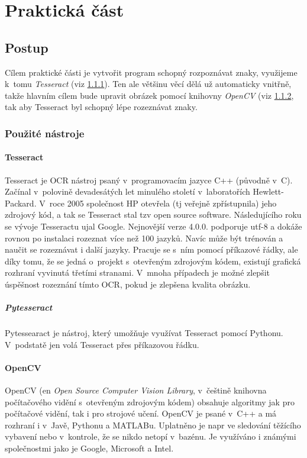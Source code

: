 \documentclass[12pt]{report}			%
\begin{document}
	
	\part{Praktická část}
	\chapter{Postup}
	Cílem praktické části je vytvořit program schopný rozpoznávat znaky, využijeme k~tomu \emph{Tesseract} (\gls{viz} \ref{sec:Tesseract}). Ten ale většinu věcí dělá už automaticky vnitřně, takže hlavním cílem bude upravit obrázek pomocí knihovny \emph{OpenCV} (\gls{viz} \ref{sec:OpenCV}, tak aby Tesseract byl schopný lépe rozeznávat znaky.
	
	\section{Použité nástroje}
	\label{sec:used}
	\subsection{Tesseract}
	\label{sec:Tesseract}
	Tesseract je \gls{OCR} nástroj psaný v~programovacím jazyce C++ (původně v~C).  Začínal v~polovině devadesátých let minulého století v~laboratořích Hewlett-Packard. V~roce 2005 společnost HP otevřela (\gls{tj} veřejně zpřístupnila) jeho zdrojový kód, a tak se Tesseract stal \gls{tzv} open source software. Následujícího roku se vývoje Tesseractu ujal Google. Nejnovější verze 4.0.0. podporuje \gls{utf-8} a dokáže rovnou po instalaci rozeznat více než 100 jazyků. Navíc může být trénován a naučit se rozeznávat i další jazyky. Pracuje se s~ním pomocí příkazové řádky, ale díky tomu, že se jedná o~projekt s~otevřeným zdrojovým kódem, existují grafická rozhraní vyvinutá třetími stranami. V~mnoha případech je možné zlepšit úspěšnost rozeznání tímto OCR, pokud je zlepšena kvalita obrázku. \parencite{tesseract_wiki}
	\subsubsection{Pytesseract}
	\label{sec:pytesseract}
	Pytessearact je nástroj, který umožňuje využívat Tesseract pomocí Pythonu. V~podstatě jen volá Tesseract přes příkazovou řádku. \parencite{pytesseract}
	\subsection{OpenCV}
	\label{sec:OpenCV}	
	OpenCV (\gls{en} \emph{Open Source Computer Vision Library}, v~češtině knihovna počítačového vidění s~otevřeným zdrojovým kódem) \parencite{opencv_library} obsahuje algoritmy jak pro počítačové vidění, tak i pro strojové učení. OpenCV je psané v~C++ a má rozhraní i v~Javě, Pythonu a MATLABu. Uplatněno je \gls{napr} ve sledování těžícího vybavení nebo v~kontrole, že se nikdo netopí v~bazénu. Je využíváno i známými společnostmi jako je Google, Microsoft a Intel. \parencite{opencv_about}
\end{document}
